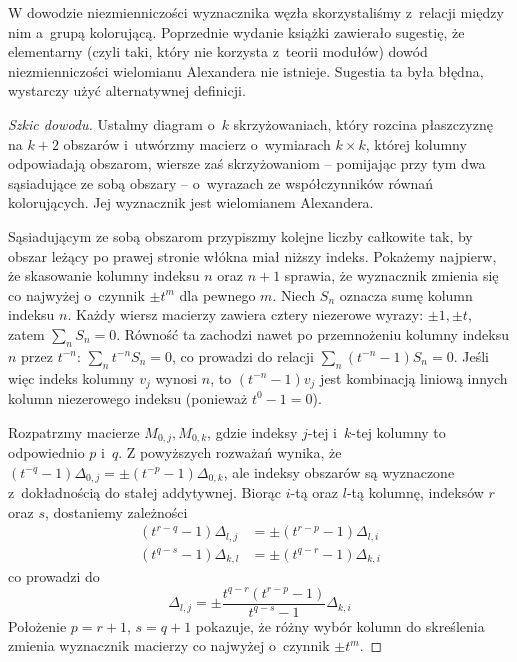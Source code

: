 W dowodzie niezmienniczości wyznacznika węzła skorzystaliśmy z~relacji między nim a~grupą kolorującą.
Poprzednie wydanie książki zawierało sugestię, że elementarny (czyli taki, który nie korzysta z~teorii modułów) dowód niezmienniczości wielomianu Alexandera nie istnieje.
Sugestia ta była błędna, wystarczy użyć alternatywnej definicji.

\begin{proof}[Szkic dowodu]
	Ustalmy diagram o~$k$ skrzyżowaniach, który rozcina płaszczyznę na $k+2$ obszarów i~utwórzmy macierz o~wymiarach $k \times k$, której kolumny odpowiadają obszarom, wiersze zaś skrzyżowaniom -- pomijając przy tym dwa sąsiadujące ze sobą obszary -- o~wyrazach ze współczynników równań kolorujących.
	Jej wyznacznik jest wielomianem Alexandera.

	Sąsiadującym ze sobą obszarom przypiszmy kolejne liczby całkowite tak, by obszar leżący po prawej stronie włókna miał niższy indeks.
	Pokażemy najpierw, że skasowanie kolumny indeksu $n$ oraz $n+1$ sprawia, że wyznacznik zmienia się co najwyżej o~czynnik $\pm t^m$ dla pewnego $m$.
	Niech $S_n$ oznacza sumę kolumn indeksu $n$.
	Każdy wiersz macierzy zawiera cztery niezerowe wyrazy: $\pm 1, \pm t$, zatem $\sum_n S_n = 0$.
	Równość ta zachodzi nawet po przemnożeniu kolumny indeksu $n$ przez $t^{-n}$: $\sum_n t^{-n}S_n = 0$, co prowadzi do relacji $\sum_n (t^{-n}-1) S_n = 0$.
	Jeśli więc indeks kolumny $v_j$ wynosi $n$, to $(t^{-n}-1)v_j$ jest kombinacją liniową innych kolumn niezerowego indeksu (ponieważ $t^0 - 1 = 0$).

	Rozpatrzmy macierze $M_{0,j}, M_{0,k}$, gdzie indeksy $j$-tej i~$k$-tej kolumny to odpowiednio $p$ i~$q$.
	Z powyższych rozważań wynika, że $(t^{-q}-1) \Delta_{0,j} = \pm (t^{-p}-1)\Delta_{0,k}$, ale indeksy obszarów są wyznaczone z~dokładnością do stałej addytywnej.
	Biorąc $i$-tą oraz $l$-tą kolumnę, indeksów $r$ oraz $s$, dostaniemy zależności
	\begin{align}
		(t^{r-q}-1) \Delta_{l,j} & = \pm (t^{r-p} - 1)\Delta_{l,i} \\
		(t^{q-s}-1) \Delta_{k,l} & = \pm (t^{q-r} - 1)\Delta_{k,i}
	\end{align}
	co prowadzi do
	\begin{equation}
		\Delta_{l,j} = \pm \frac{t^{q-r}(t^{r-p}-1)}{t^{q-s}-1} \Delta_{k,i}
	\end{equation}
	Położenie $p = r +1$, $s =q+1$ pokazuje, że różny wybór kolumn do skreślenia zmienia wyznacznik macierzy co najwyżej o~czynnik $\pm t^m$.


\end{proof}
